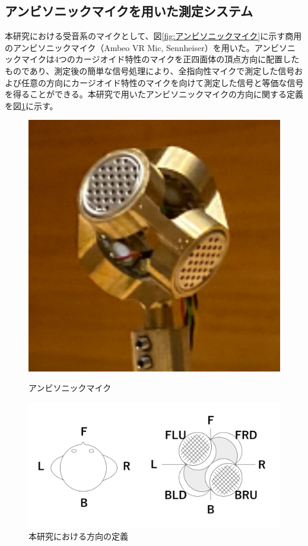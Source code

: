 \documentclass[11pt,a4j]{jreport}
\begin{document}
\newpage
\subsection{アンビソニックマイクを用いた測定システム}
本研究における受音系のマイクとして、図\ref{fig:アンビソニックマイク}に示す商用のアンビソニックマイク（Ambeo VR Mic, Sennheiser）を用いた。アンビソニックマイクは4つのカージオイド特性のマイクを正四面体の頂点方向に配置したものであり、測定後の簡単な信号処理により、全指向性マイクで測定した信号および任意の方向にカージオイド特性のマイクを向けて測定した信号と等価な信号を得ることができる\cite{西村竜一2014}。本研究で用いたアンビソニックマイクの方向に関する定義を図\ref{fig:方向の定義}に示す。

\begin{figure}[H]
  \begin{minipage}[b]{.33\textwidth}
      \centering
      \includegraphics[width=.8\linewidth]{images/ambisonicMic.png}
      \caption{アンビソニックマイク}
      \label{fig:アンビソニックマイク}
  \end{minipage}%
  \begin{minipage}[b]{.66\textwidth}
      \centering
      \includegraphics[width=.8\linewidth]{images/ambisonicMicDirectionDef.png}
      \caption{本研究における方向の定義}
      \label{fig:方向の定義}
  \end{minipage}
\end{figure}
\end{document}
